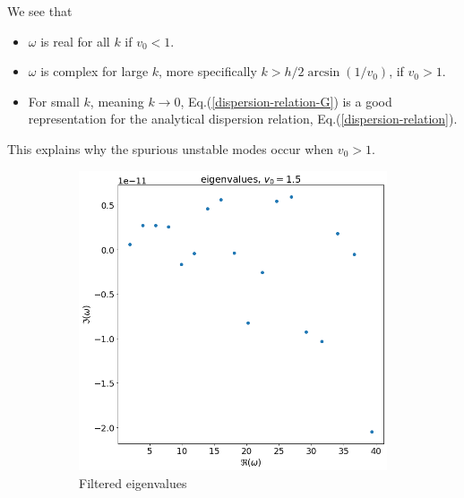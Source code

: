 We see that 
\begin{itemize}
	\item $\omega$ is real for all $k$ if $v_0 < 1$.
	\item $\omega$ is complex for large $k$, more specifically $k>h/2\arcsin(1/v_0)$, if $v_0 > 1$.
	\item For small $k$, meaning $k\to 0$, Eq.(\ref{dispersion-relation-G}) is a good representation for the analytical dispersion relation, Eq.(\ref{dispersion-relation}). 
\end{itemize}
This explains why the spurious unstable modes occur when $v_0>1$.


\begin{figure}[H]
	\centering
	\begin{subfigure}[b]{0.5\linewidth}
		\includegraphics[width=\linewidth]{img/spectral_theory/eigvals_G_filtered.png} 
		\caption{Filtered eigenvalues}
		\label{fig:results-G-a}
	\end{subfigure}%
	\begin{subfigure}[b]{0.5\linewidth}

\end{subfigure}
\end{figure}

